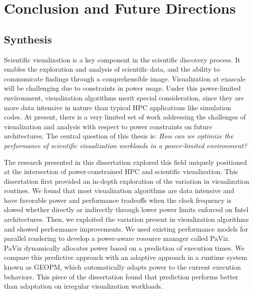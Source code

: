 \chapter{Conclusion and Future Directions}
\label{ch:concl}

\section{Synthesis}

Scientific visualization is a key component in the scientific discovery process.
%
It enables the exploration and analysis of scientific data, and the ability to
communicate findings through a comprehensible image.
%
Visualization at exascale will be challenging due to constraints in power
usage.
%
Under this power-limited environment, visualization algorithms merit special
consideration, since they are more data intensive in nature than typical HPC
applications like simulation codes.
%
At present, there is a very limited set of work addressing the challenges of
visualization and analysis with respect to power constraints on future
architectures.
%
The central question of this thesis is: \emph{How can we optimize the
performance of scientific visualization workloads in a power-limited
environment?}

The research presented in this dissertation explored this field uniquely
positioned at the intersection of power-constrained HPC and scientific
visualization.
%
This dissertation first provided an in-depth exploration of the variation in
visualization routines.
%
We found that most visualization algorithms are data intensive and have
favorable power and performance tradeoffs when the clock frequency is slowed
whether directly or indirectly through lower power limits enforced on Intel
architectures.
%
Then, we exploited the variation present in visualization algorithms and showed
performance improvements.
%
We used existing performance models for parallel rendering to develop a
power-aware resource manager called PaViz.
%
PaViz dynamically allocates power based on a prediction of execution times.
%
We compare this predictive approach with an adaptive approach in a runtime
system known as GEOPM, which automatically adapts power to the current
execution behaviors.
%
This piece of the dissertation found that prediction performs better than
adaptation on irregular visualization workloads.

